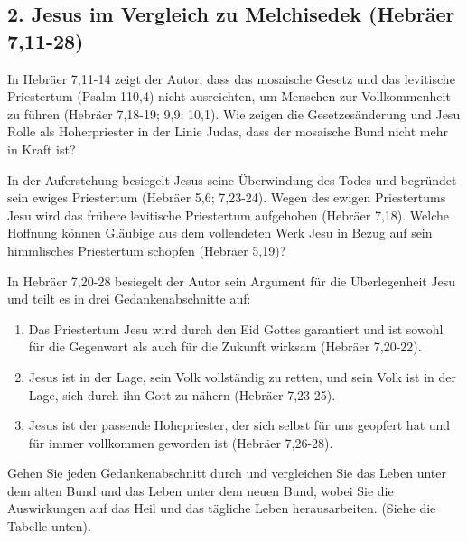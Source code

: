 \documentclass[]{krantz}
\providecommand{\tightlist}{%
  \setlength{\itemsep}{0pt}\setlength{\parskip}{0pt}}
\begin{document}
\subsection{2. Jesus im Vergleich zu Melchisedek (Hebräer
7,11-28)}\label{jesus-im-vergleich-zu-melchisedek-hebruxe4er-711-28}

In Hebräer 7,11-14 zeigt der Autor, dass das mosaische Gesetz und das
levitische Priestertum (Psalm 110,4) nicht ausreichten, um Menschen zur
Vollkommenheit zu führen (Hebräer 7,18-19; 9,9; 10,1). Wie zeigen die
Gesetzesänderung und Jesu Rolle als Hoherpriester in der Linie Judas,
dass der mosaische Bund nicht mehr in Kraft ist?

In der Auferstehung besiegelt Jesus seine Überwindung des Todes und
begründet sein ewiges Priestertum (Hebräer 5,6; 7,23-24). Wegen des
ewigen Priestertums Jesu wird das frühere levitische Priestertum
aufgehoben (Hebräer 7,18). Welche Hoffnung können Gläubige aus dem
vollendeten Werk Jesu in Bezug auf sein himmlisches Priestertum schöpfen
(Hebräer 5,19)?

In Hebräer 7,20-28 besiegelt der Autor sein Argument für die
Überlegenheit Jesu und teilt es in drei Gedankenabschnitte auf:

\begin{enumerate}
\def\labelenumi{\arabic{enumi}.}
\tightlist
\item
  Das Priestertum Jesu wird durch den Eid Gottes garantiert und ist
  sowohl für die Gegenwart als auch für die Zukunft wirksam (Hebräer
  7,20-22).
\item
  Jesus ist in der Lage, sein Volk vollständig zu retten, und sein Volk
  ist in der Lage, sich durch ihn Gott zu nähern (Hebräer 7,23-25).
\item
  Jesus ist der passende Hohepriester, der sich selbst für uns geopfert
  hat und für immer vollkommen geworden ist (Hebräer 7,26-28).
\end{enumerate}

Gehen Sie jeden Gedankenabschnitt durch und vergleichen Sie das Leben
unter dem alten Bund und das Leben unter dem neuen Bund, wobei Sie die
Auswirkungen auf das Heil und das tägliche Leben herausarbeiten. (Siehe
die Tabelle unten).
\end{document}
